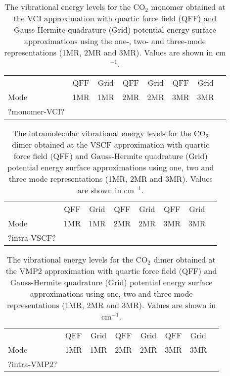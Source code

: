 \documentclass[aip,jcp,showpacs,superscriptaddress,groupedaddress]{revtex4-1}  %
\begin{document}
\begin{table}[h]
    \caption{The vibrational energy levels for the CO$_2$ monomer obtained at the VCI approximation with quartic force field (QFF) and Gauss-Hermite quadrature (Grid) potential energy surface approximations using the one-, two- and three-mode representations (1MR, 2MR and 3MR). Values are shown in cm$^{-1}$.}
\begin{ruledtabular}
\begin{tabular}{lccccccc}
    & QFF &  Grid & QFF & Grid & QFF & Grid   \\  
  Mode & 1MR & 1MR & 2MR & 2MR & 3MR & 3MR   \\ 
\hline \Tstrut
?monomer-VCI?
\end{tabular}
\end{ruledtabular}
\label{table:monomer-vci}
\end{table}


\begin{table}[H]
\caption{The intramolecular vibrational energy levels for the CO$_2$ dimer obtained at the VSCF approximation with quartic force field (QFF) and Gauss-Hermite quadrature (Grid) potential energy surface approximations using one, two and three mode representations (1MR, 2MR and 3MR). Values are shown in cm$^{-1}$.}
\begin{ruledtabular}
\begin{tabular}{lccccccc}
    & QFF &  Grid & QFF & Grid & QFF & Grid   \\  
  Mode & 1MR & 1MR & 2MR & 2MR & 3MR & 3MR   \\ 
\hline \Tstrut
?intra-VSCF?
\end{tabular}
\end{ruledtabular}
\label{table:intra-vscf}
\end{table}

\begin{table}[H]
\caption{The vibrational energy levels for the CO$_2$ dimer obtained at the VMP2 approximation with quartic force field (QFF) and Gauss-Hermite quadrature (Grid) potential energy surface approximations using one, two and three mode representations (1MR, 2MR and 3MR). Values are shown in cm$^{-1}$.}
\begin{ruledtabular}
\begin{tabular}{lccccccc}
    & QFF &  Grid & QFF & Grid & QFF & Grid   \\  
  Mode & 1MR & 1MR & 2MR & 2MR & 3MR & 3MR   \\ 
\hline \Tstrut
?intra-VMP2?
\end{tabular}
\end{ruledtabular}
\label{table:intra-vmp2}
\end{table}
\end{document}

